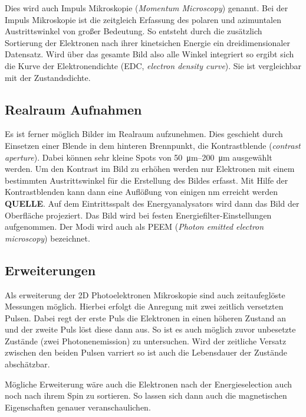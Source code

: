             Dies wird auch Impuls Mikroskopie (\textit{Momentum Microscopy}) genannt.
            Bei der Impuls Mikroskopie ist die zeitgleich Erfassung des polaren und azimuntalen Austrittswinkel von großer Bedeutung. 
            So entsteht durch die zusätzlich Sortierung der Elektronen nach ihrer kinetsichen Energie ein dreidimensionaler Datensatz.
            Wird über das gesamte Bild also alle Winkel integriert so ergibt sich die Kurve der Elektronendichte (EDC, \textit{electron density curve}).
            Sie ist vergleichbar mit der Zustandsdichte.

        \subsection{Realraum Aufnahmen}
            Es ist ferner möglich Bilder im Realraum aufzunehmen.
            Dies geschieht durch Einsetzen einer Blende in dem hinteren Brennpunkt, die Kontrastblende (\textit{contrast aperture}).
            Dabei können sehr kleine Spots von \SIrange{50}{200}{\micro\meter} ausgewählt werden.
            Um den Kontrast im Bild zu erhöhen werden nur Elektronen mit einem bestimmten Austrittswinkel für die Erstellung des Bildes erfasst.
            Mit Hilfe der Kontrastblenden kann dann eine Auflößung von einigen \si{\nano\meter} erreicht werden \textbf{QUELLE}. 
            Auf dem Eintrittsspalt des Energyanalysators wird dann das Bild der Oberfläche projeziert.
            Das Bild wird bei festen Energiefilter-Einstellungen aufgenommen.
            Der Modi wird auch als PEEM (\textit{Photon emitted electron microscopy}) bezeichnet.

        \subsection{Erweiterungen}
            Als erweiterung der 2D Photoelektronen Mikroskopie sind auch zeitaufeglöste Messungen möglich.
            Hierbei erfolgt die Anregung mit zwei zeitlich versetzten Pulsen. 
            Dabei regt der erste Puls die Elektronen in einen höheren Zustand an und der zweite Puls löst diese dann aus.
            So ist es auch möglich zuvor unbesetzte Zustände (zwei Photonenemission) zu untersuchen.
            Wird der zeitliche Versatz zwischen den beiden Pulsen varriert so ist auch die Lebensdauer der Zustände abschätzbar.

            Mögliche Erweiterung wäre auch die Elektronen nach der Energieselection auch noch nach ihrem Spin zu sortieren.
            So lassen sich dann auch die magnetischen Eigenschaften genauer veranschaulichen.
        

